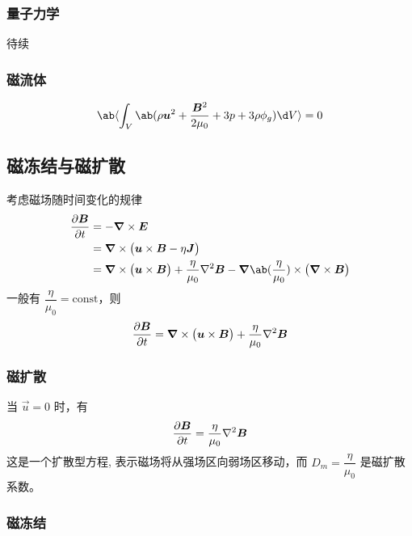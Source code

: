 \subsubsection{量子力学}

待续

\subsubsection{磁流体}

\begin{equation}
\ab\langle \int_V \ab(
    \rho \vec{u}^2 + \frac{\vec{B}^2}{2 \mu_0} + 3 p + 3 \rho \phi_g
) \d V \rangle = 0
\end{equation}

\subsection{磁冻结与磁扩散}

考虑磁场随时间变化的规律
\begin{equation}\begin{aligned}
    \pdv{\vec{B}}{t} &= - \curl{\vec{E}} \\
    &= \curl{\big( \vec{u} \times \vec{B} - \eta \vec{J} \big)} \\
    &= \curl{\big( \vec{u} \times \vec{B} \big)}
    + \frac{\eta}{\mu_0} \laplacian{\vec{B}}
    - \grad{\ab(\frac{\eta}{\mu_0})} \times \big(\curl{\vec{B}}\big)
\end{aligned}\end{equation}
一般有 $\dfrac{\eta}{\mu_0} = \text{const}$，则
\begin{equation}
    \pdv{\bm{B}}{t} = \bm{\nabla} \times{\big( \bm{u} \times \bm{B} \big)}
    + \frac{\eta}{\mu_0} \nabla^2{\bm{B}}
\end{equation}

\subsubsection{磁扩散}

当 $\vec{u}=0$ 时，有
\begin{equation}
    \pdv{\bm{B}}{t} = \frac{\eta}{\mu_0} \nabla^2{\bm{B}}
\end{equation}
这是一个扩散型方程, 表示磁场将从强场区向弱场区移动，而 $D_m = \dfrac{\eta}{\mu_0}$ 是磁扩散系数。

\subsubsection{磁冻结}

